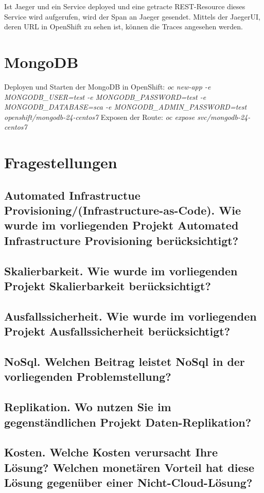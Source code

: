 \documentclass[11pt, a4paper, twoside]{article}   	%
\begin{document}
Ist Jaeger und ein Service deployed und eine getracte REST-Resource dieses Service wird aufgerufen, wird der Span an Jaeger gesendet. Mittels der JaegerUI, deren URL in OpenShift zu sehen ist, können die Traces angesehen werden.

\section{MongoDB}
Deployen und Starten der MongoDB in OpenShift: \newline
\textit{oc new-app -e MONGODB\_USER=test -e MONGODB\_PASSWORD=test -e MONGODB\_DATABASE=sca -e MONGODB\_ADMIN\_PASSWORD=test openshift/mongodb-24-centos7} \newline
Exposen der Route: \newline
\textit{oc expose svc/mongodb-24-centos7}

\section{Fragestellungen}
\subsection{Automated Infrastructue Provisioning/(Infrastructure-as-Code). Wie wurde im vorliegenden Projekt Automated Infrastructure Provisioning berücksichtigt?}

\subsection{Skalierbarkeit. Wie wurde im vorliegenden Projekt Skalierbarkeit berücksichtigt?}

\subsection{Ausfallssicherheit.  Wie wurde im vorliegenden Projekt Ausfallssicherheit berücksichtigt?}

\subsection{NoSql. Welchen Beitrag leistet NoSql in der vorliegenden Problemstellung?}

\subsection{Replikation. Wo nutzen Sie im gegenständlichen Projekt Daten-Replikation?}

\subsection{Kosten. Welche Kosten verursacht Ihre Lösung? Welchen monetären Vorteil hat diese Lösung gegenüber einer Nicht-Cloud-Lösung?}
\end{document}
